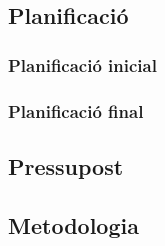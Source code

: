 \documentclass[12pt,a4paper,final,twoside]{article}
\begin{document}
\subsection{Planificació}
\label{Planificacio}

\subsubsection{Planificació inicial}


\subsubsection{Planificació final}


\subsection{Pressupost}
\label{Pressupost}



\subsection{Metodologia}
\label{Metodologia}
\end{document}
